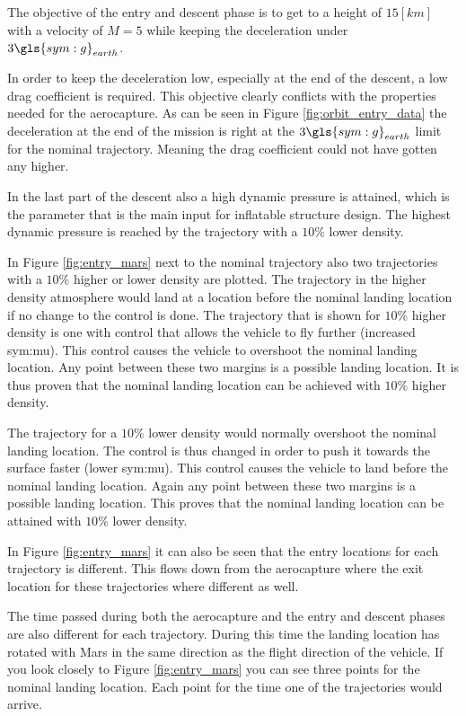 The objective of the entry and descent phase is to get to a height of $15 \left[km\right]$ with a velocity of $M = 5$ while keeping the deceleration under $3 \gls{sym:g}_{earth}$.

In order to keep the deceleration low, especially at the end of the descent, a low drag coefficient is required. This objective clearly conflicts with the properties needed for the aerocapture. As can be seen in Figure \ref{fig:orbit_entry_data} the deceleration at the end of the mission is right at the $3 \gls{sym:g}_{earth}$ limit for the nominal trajectory. Meaning the drag coefficient could not have gotten any higher.

In the last part of the descent also a high dynamic pressure is attained, which is the parameter that is the main input for inflatable structure design. The highest dynamic pressure is reached by the trajectory with a $10\%$ lower density.

In Figure \ref{fig:entry_mars} next to the nominal trajectory also two trajectories with a $10\%$ higher or lower density are plotted. The trajectory in the higher density atmosphere would land at a location before the nominal landing location if no change to the control is done. The trajectory that is shown for $10\%$ higher density is one with control that allows the vehicle to fly further (increased \gls{sym:mu}). This control causes the vehicle to overshoot the nominal landing location. Any point between these two margins is a possible landing location. It is thus proven that the nominal landing location can be achieved with $10\%$ higher density.

The trajectory for a $10\%$ lower density would normally overshoot the nominal landing location. The control is thus changed in order to push it towards the surface faster (lower \gls{sym:mu}). This control causes the vehicle to land before the nominal landing location. Again any point between these two margins is a possible landing location. This proves that the nominal landing location can be attained with $10\%$ lower density.

In Figure \ref{fig:entry_mars} it can also be seen that the entry locations for each trajectory is different. This flows down from the aerocapture where the exit location for these trajectories where different as well.

The time passed during both the aerocapture and the entry and descent phases are also different for each trajectory. During this time the landing location has rotated with Mars in the same direction as the flight direction of the vehicle. If you look closely to Figure \ref{fig:entry_mars} you can see three points for the nominal landing location. Each point for the time one of the trajectories would arrive.

